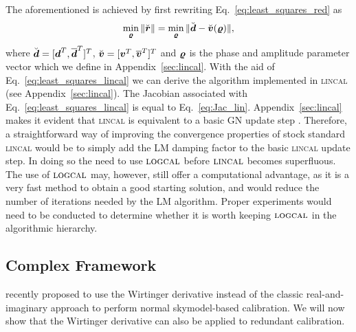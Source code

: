 \documentclass[useAMS,usenatbib]{mn2e}
\newcommand{\bz}{\bmath{z}}
\newcommand{\br}{\bmath{r}}
\newcommand{\bg}{\bmath{g}}
\newcommand{\bd}{\bmath{d}}
\newcommand{\bv}{\bmath{v}}
\newcommand{\by}{\bmath{y}}
\newcommand{\conj}[1]{\overline{#1}}
\begin{document}
The aforementioned is achieved by first rewriting Eq.~\eqref{eq:least_squares_red} as
\begin{equation}
\label{eq:least_squares_lincal}
\min_{\bmath{\varrho}} \|\breve{\br}\| = \min_{\bmath{\varrho}} \|\breve{\bd} - \breve{\bv}(\bmath{\varrho})\|, 
\end{equation}
where $\breve{\bd} = [\bd^T,\conj{\bd}^T]^T$, $\breve{\bv} = [\bv^T,\conj{\bv}^T]^T$ and $\bmath{\varrho}$ is the phase and amplitude parameter vector which we define in Appendix~\ref{sec:lincal}. 
With the aid of Eq.~\eqref{eq:least_squares_lincal} we can derive the algorithm implemented in \textsc{lincal} (see Appendix~\ref{sec:lincal}).
The Jacobian associated with Eq.~\eqref{eq:least_squares_lincal} is equal to Eq.~\eqref{eq:Jac_lin}. 
Appendix~\ref{sec:lincal} makes it evident that \textsc{lincal} is equivalent to a basic GN update step \citep{Kurien2016}. 
Therefore, a straightforward way of improving the convergence properties of stock standard \textsc{lincal} would be to simply add the LM damping factor to the basic \textsc{lincal} update step.
In doing so the need to use $\textsc{logcal}$ before $\textsc{lincal}$ becomes superfluous. The use of $\textsc{logcal}$ may, however, still offer 
a computational advantage, as it is a very fast method to obtain a good starting solution, and would reduce the number of iterations needed by the LM algorithm.
Proper experiments would need to be conducted to determine whether it is worth keeping $\textsc{logcal}$ in the algorithmic hierarchy. 

\subsection{Complex Framework}
\label{sec:w}

\citet{Smirnov2015} recently proposed to use the Wirtinger derivative instead of the classic real-and-imaginary approach to perform normal skymodel-based calibration. We will now show
that the Wirtinger derivative can also be applied to redundant calibration.

\end{document}
